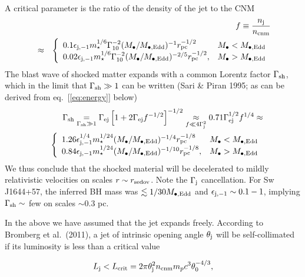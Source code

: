 \documentclass[usenatbib,fleqn]{mnras}
\begin{document}
A critical parameter is the ratio of the density of the jet to the CNM
\begin{eqnarray}
&&f \equiv \frac{n_{\rm j}}{n_{\rm cnm}}  \nonumber \\
&\approx & \left\{
\begin{array}{lr}
0.1\epsilon_{\rm j,-1}m_{\star}^{1/6}\Gamma_{10}^{-2}(M_{\bullet}/M_{\bullet, \rm Edd})^{-1}r_{\rm pc}^{-1/2}
&  M_{\bullet} < M_{\bullet, \rm Edd} \\
0.02\epsilon_{\rm j,-1}m_{\star}^{1/6}\Gamma_{10}^{-2}(M_{\bullet}/M_{\bullet, \rm Edd})^{-2/5}r_{\rm pc}^{-1/2}
,& M_{\bullet} > M_{\bullet, \rm Edd}\\
\end{array}
\right. 
\label{eq:f}
\end{eqnarray}
The blast wave of shocked matter expands with a common Lorentz factor $\Gamma_{\rm sh}$, which 
in the limit that $\Gamma_{\rm sh} \gg 1$ can be written (Sari \& Piran 1995; as can be derived from eq.~[\ref{eq:energy}] below)
\begin{eqnarray}
&&\Gamma_{\rm sh} \underset{\Gamma_{\rm sh} \gg 1}= \Gamma_{\rm ej}\left[1 + 2\Gamma_{\rm ej}f^{-1/2}\right]^{-1/2} \underset{f \ll 4\Gamma_{\rm j}^{2}}\approx 0.71\Gamma_{\rm ej}^{1/2}f^{1/4} \approx \nonumber \\
&&\left\{
\begin{array}{lr}
1.26\epsilon_{\rm j,-1}^{1/4}m_{\star}^{1/24}(M_{\bullet}/M_{\bullet, \rm Edd})^{-1/4}r_{\rm pc}^{-1/8}
&  M_{\bullet} < M_{\bullet, \rm Edd} \\
0.84\epsilon_{\rm j,-1}m_{\star}^{1/24}(M_{\bullet}/M_{\bullet, \rm Edd})^{-1/10}r_{\rm pc}^{-1/8}
,& M_{\bullet} > M_{\bullet, \rm Edd}\\
\end{array}
\right. 
\label{eq:gammash}
\end{eqnarray}
We thus conclude that the shocked material will be decelerated to
mildly relativistic velocities on scales $r \sim r_{\rm sedov}$.  Note
the $\Gamma_{\rm j}$ cancellation.  For Sw J1644+57, the inferred BH
mass was $\lesssim 1/30M_{\bullet,\rm Edd}$ and $\epsilon_{\rm j,-1}
\sim 0.1-1$, implying $\Gamma_{\rm sh} \sim $ few on scales $\sim 0.3$
pc.

In the above we have assumed that the jet expands freely.  According
to Bromberg et al.~(2011), a jet of intrinsic opening angle
$\theta_{\rm j}$ will be self-collimated if its luminosity is less
than a critical value

\begin{equation}
L_{\rm j} < L_{\rm crit} = 2\pi \theta_{\rm j}^{2}n_{\rm cnm} m_p c^{3}\theta_0^{-4/3},
\end{equation}
\end{document}
